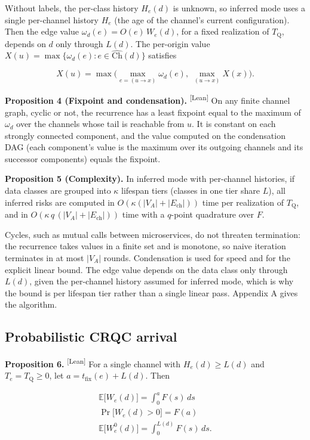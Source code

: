 \documentclass[conference]{IEEEtran}
\newcommand{\Tq}{T_{\mathrm{Q}}}
\newcommand{\tfix}{t_{\mathrm{fix}}}
\newcommand{\Ch}{\mathrm{Ch}}
\providecommand{\E}{}\renewcommand{\E}{\mathbb{E}}
\providecommand{\gt}{}\renewcommand{\gt}{>}
\newcommand{\leantag}{\textsuperscript{\textsf{\scriptsize[Lean]}}}
\newenvironment{envblock}{\par\smallskip\noindent\ignorespaces}{\par\smallskip}
\begin{document}
Without labels, the per-class history $H_e(d)$ is unknown, so inferred mode uses a single per-channel history $H_e$ (the age of the channel's current configuration). Then the edge value $\omega_d(e) = O(e)\,W_e(d)$, for a fixed realization of $\Tq$, depends on $d$ only through $L(d)$. The per-origin value $X(u) = \max\{\omega_d(e) : e \in \widehat{\Ch}(d)\}$ satisfies

\[ X(u) = \max\Big(\max_{e = (u \to x)} \omega_d(e),\; \max_{(u \to x)} X(x)\Big). \]

\begin{envblock}

\textbf{Proposition 4 (Fixpoint and condensation).} \leantag{} On any finite channel graph, cyclic or not, the recurrence has a least fixpoint equal to the maximum of $\omega_d$ over the channels whose tail is reachable from $u$. It is constant on each strongly connected component, and the value computed on the condensation DAG (each component's value is the maximum over its outgoing channels and its successor components) equals the fixpoint.

\textbf{Proposition 5 (Complexity).} In inferred mode with per-channel histories, if data classes are grouped into $\kappa$ lifespan tiers (classes in one tier share $L$), all inferred risks are computed in $O(\kappa(|V_A| + |E_{\mathrm{ch}}|))$ time per realization of $\Tq$, and in $O(\kappa\, q\, (|V_A| + |E_{\mathrm{ch}}|))$ time with a $q$-point quadrature over $F$.
\end{envblock}

Cycles, such as mutual calls between microservices, do not threaten termination: the recurrence takes values in a finite set and is monotone, so naive iteration terminates in at most $|V_A|$ rounds. Condensation is used for speed and for the explicit linear bound. The edge value depends on the data class only through $L(d)$, given the per-channel history assumed for inferred mode, which is why the bound is per lifespan tier rather than a single linear pass. Appendix A gives the algorithm.

\subsection{Probabilistic CRQC arrival}\label{sec:6.5}

\begin{envblock}

\textbf{Proposition 6.} \leantag{} For a single channel with $H_e(d) \ge L(d)$ and $T_e = \Tq \ge 0$, let $a = \tfix(e) + L(d)$. Then

\begin{gather*}
\E\big[W_e(d)\big] = \int_0^{a} F(s)\,ds \\
\Pr\big[W_e(d) \gt 0\big] = F(a) \\
\E\big[W^0_e(d)\big] = \int_0^{L(d)} F(s)\,ds.
\end{gather*}
\end{envblock}
\end{document}
